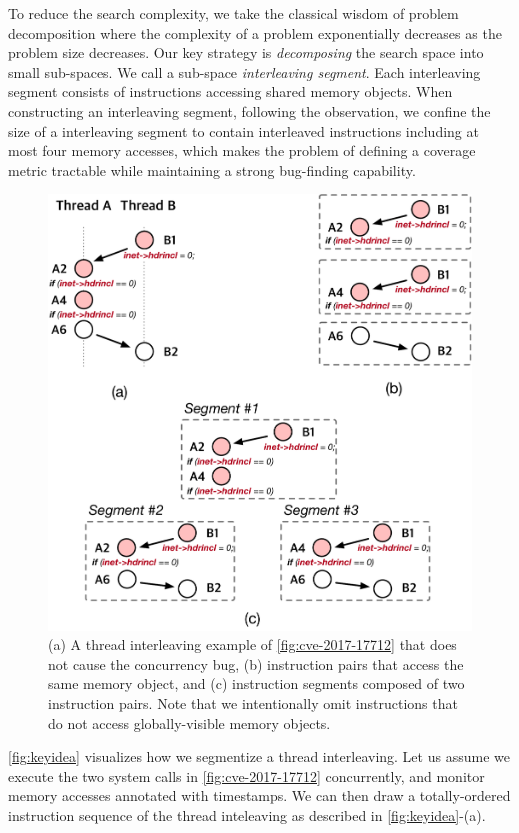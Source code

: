 %
To reduce the search complexity, we take the classical wisdom of
problem decomposition where the complexity of a problem exponentially
decreases as the problem size decreases.
%
Our key strategy is \textit{decomposing} the search space into small
sub-spaces. We call a sub-space \textit{interleaving segment}.
%
Each interleaving segment consists of instructions accessing 
shared memory objects.
%
%
When constructing an interleaving segment, following the observation, 
we confine the size of a interleaving segment 
to contain interleaved instructions including at most four memory accesses,
which makes the problem of defining a coverage metric tractable while maintaining a strong bug-finding capability.


%
\begin{figure}[t]
  \centering
  \includegraphics[width=0.7\linewidth]{fig/intuition.pdf}
  \caption{(a) A thread interleaving example of
    \autoref{fig:cve-2017-17712} that does not cause the concurrency
    bug, (b) instruction pairs that access the same memory object, and
    (c) instruction segments composed of two instruction pairs.  Note
    that we intentionally omit instructions that do not access
    globally-visible memory objects. }
  \label{fig:keyidea}
\end{figure}
%
\autoref{fig:keyidea} visualizes how we segmentize a thread
interleaving.
%
Let us assume we execute the two system calls in
\autoref{fig:cve-2017-17712} concurrently, and monitor memory accesses
annotated with timestamps.
%
We can then draw a totally-ordered instruction sequence of the thread
inteleaving as described in \autoref{fig:keyidea}-(a).
%

